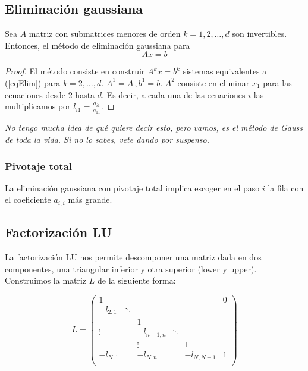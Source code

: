 \documentclass[nochap]{apuntes}
\begin{document}
\subsection{Eliminación gaussiana}

\begin{theorem}
Sea $A$ matriz con submatrices menores de orden $k = 1,2,\dotsc, d$ son invertibles. Entonces, el método de eliminación gaussiana para 
\begin{equation}
 Ax = b \label{eqElim}
 \end{equation}
\end{theorem}

\begin{proof}
El método consiste en construir $A^kx=b^k$ sistemas equivalentes a (\ref{eqElim}) para $k = 2,\dotsc, d$. $A^1 = A\, ,b^1 = b$. $A^2$ consiste en eliminar $x_1$ para las ecuaciones desde $2$ hasta $d$. Es decir, a cada una de las ecuaciones $i$ las multiplicamos por $l_{i1} = \frac{a_{i1}}{a_{11}}$.
\end{proof}

\textit{No tengo mucha idea de qué quiere decir esto, pero vamos, es el método de Gauss de toda la vida. Si no lo sabes, vete dando por suspenso.}

\subsubsection{Pivotaje total}

La eliminación gaussiana con pivotaje total implica escoger en el paso $i$ la fila con el coeficiente $a_{i,i}$ más grande.

\subsection{Factorización LU}

La factorización LU nos permite descomponer una matriz dada en dos componentes, una triangular inferior y otra superior (lower y upper). Construimos la matriz $L$ de la siguiente forma:

\[ L =
\begin{pmatrix}
       1 &        &            &        &            & 0 \\
-l_{2,1} & \ddots &            &        &            &   \\
         &        &          1 &        &            &   \\
  \vdots &        & -l_{n+1,n} & \ddots &            &   \\
         &        &     \vdots &        &       1    &   \\
-l_{N,1} &        & -l_{N,n}   &        & -l_{N,N-1} & 1 \\
\end{pmatrix} \]
\end{document}
